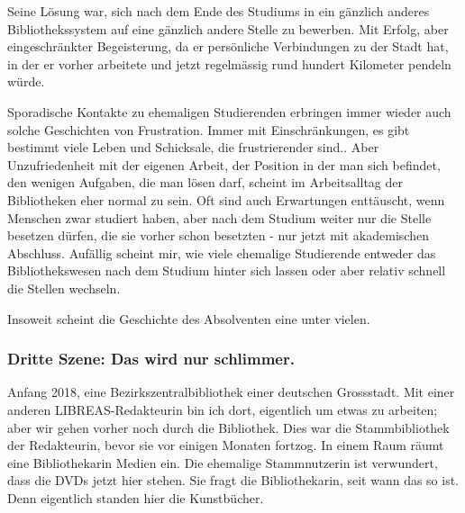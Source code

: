 \documentclass[a4paper,
fontsize=11pt,
oneside,
numbers=noperiodatend,
parskip=half-,
bibliography=totoc,
final
]{scrartcl}
\begin{document}
Seine Lösung war, sich nach dem Ende des Studiums in ein gänzlich
anderes Bibliothekssystem auf eine gänzlich andere Stelle zu bewerben.
Mit Erfolg, aber eingeschränkter Begeisterung, da er persönliche
Verbindungen zu der Stadt hat, in der er vorher arbeitete und jetzt
regelmässig rund hundert Kilometer pendeln würde.

Sporadische Kontakte zu ehemaligen Studierenden erbringen immer wieder
auch solche Geschichten von Frustration. Immer mit Einschränkungen, es
gibt bestimmt viele Leben und Schicksale, die frustrierender sind.. Aber
Unzufriedenheit mit der eigenen Arbeit, der Position in der man sich
befindet, den wenigen Aufgaben, die man lösen darf, scheint im
Arbeitsalltag der Bibliotheken eher normal zu sein. Oft sind auch
Erwartungen enttäuscht, wenn Menschen zwar studiert haben, aber nach dem
Studium weiter nur die Stelle besetzen dürfen, die sie vorher schon
besetzten - nur jetzt mit akademischen Abschluss. Aufällig scheint mir,
wie viele ehemalige Studierende entweder das Bibliothekswesen nach dem
Studium hinter sich lassen oder aber relativ schnell die Stellen
wechseln.

Insoweit scheint die Geschichte des Absolventen eine unter vielen.

\hypertarget{dritte-szene-das-wird-nur-schlimmer.}{%
\subsubsection*{Dritte Szene: Das wird nur
schlimmer.}\label{dritte-szene-das-wird-nur-schlimmer.}}

Anfang 2018, eine Bezirkszentralbibliothek einer deutschen Grossstadt.
Mit einer anderen LIB\-REAS-Redakteurin bin ich dort, eigentlich um etwas
zu arbeiten; aber wir gehen vorher noch durch die Bibliothek. Dies war
die Stammbibliothek der Redakteurin, bevor sie vor einigen Monaten
fortzog. In einem Raum räumt eine Bibliothekarin Medien ein. Die
ehemalige Stammnutzerin ist verwundert, dass die DVDs jetzt hier stehen.
Sie fragt die Bibliothekarin, seit wann das so ist. Denn eigentlich
standen hier die Kunstbücher.
\end{document}
